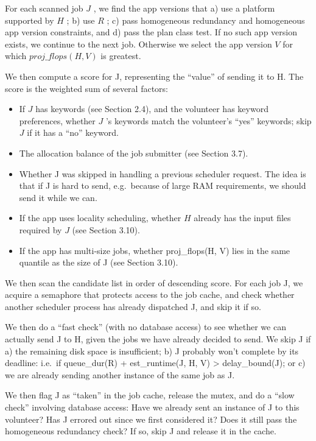 \documentclass[
]{article}
\begin{document}
For each scanned job \(J\) , we find the app versions that a) use a
platform supported by \(H\) ; b) use \(R\) ; c) pass homogeneous
redundancy and homogeneous app version constraints, and d) pass the plan
class test. If no such app version exists, we continue to the next job.
Otherwise we select the app version \(V\) for which
\(proj\_flops(H, V)\) is greatest.

We then compute a score for J, representing the ``value'' of sending it
to H. The score is the weighted sum of several factors:

\begin{itemize}
\item
  If \(J\) has keywords (see Section 2.4), and the volunteer has keyword
  preferences, whether \(J\) 's keywords match the volunteer's ``yes''
  keywords; skip \(J\) if it has a ``no'' keyword.\\
\item
  The allocation balance of the job submitter (see Section 3.7).\\
\item
  Whether J was skipped in handling a previous scheduler request. The
  idea is that if J is hard to send, e.g.~because of large RAM
  requirements, we should send it while we can.
\item
  If the app uses locality scheduling, whether \(H\) already has the
  input files required by \(J\) (see Section 3.10).\\
\item
  If the app has multi-size jobs, whether proj\_flops(H, V) lies in the
  same quantile as the size of J (see Section 3.10).
\end{itemize}

We then scan the candidate list in order of descending score. For each
job J, we acquire a semaphore that protects access to the job cache, and
check whether another scheduler process has already dispatched J, and
skip it if so.

We then do a ``fast check'' (with no database access) to see whether we
can actually send J to H, given the jobs we have already decided to
send. We skip J if a) the remaining disk space is insufficient; b) J
probably won't complete by its deadline: i.e.~if queue\_dur(R) +
est\_runtime(J, H, V) \textgreater{} delay\_bound(J); or c) we are
already sending another instance of the same job as J.

We then flag J as ``taken'' in the job cache, release the mutex, and do
a ``slow check'' involving database access: Have we already sent an
instance of J to this volunteer? Has J errored out since we first
considered it? Does it still pass the homogeneous redundancy check? If
so, skip J and release it in the cache.
\end{document}
